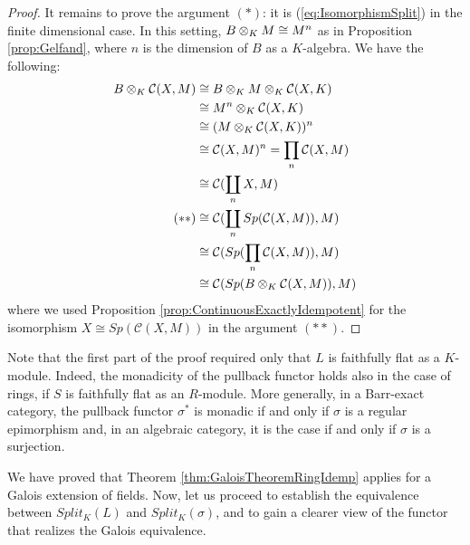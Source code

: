 \begin{proposition}
\begin{proof}
        It remains to prove the argument $(*)$: it is (\ref{eq:IsomorphismSplit}) in the finite dimensional case. In this setting, $B\otimes_{K}M\cong M^n$ as in Proposition \ref{prop:Gelfand}, where $n$ is the dimension of $B$ as a $K$-algebra. We have the following:
        \begin{align*}
            B\otimes_{K}\mathcal{C}(X,M) & \cong B\otimes_{K}M\otimes_{K}\mathcal{C}(X,K)\\
            & \cong M^n\otimes_{K}\mathcal{C}(X,K)\\
            & \cong (M\otimes_{K}\mathcal{C}(X,K))^n\\
            & \cong \mathcal{C}(X,M)^n = \prod_n\mathcal{C}(X,M)\\
            & \cong \mathcal{C}(\coprod_nX, M)\\
            (**)& \cong \mathcal{C}(\coprod_nSp(\mathcal{C}(X,M)),M)\\
            & \cong \mathcal{C}(Sp(\prod_n\mathcal{C}(X,M)), M)\\
            & \cong \mathcal{C}(Sp(B\otimes_{K}\mathcal{C}(X,M)),M)
        \end{align*}
        where we used Proposition \ref{prop:ContinuousExactlyIdempotent} for the isomorphism $X\cong Sp(\mathcal{C}(X,M))$ in the argument $(**)$.
    \end{proof}
\end{proposition}
\begin{oss*}
    Note that the first part of the proof required only that $L$ is faithfully flat as a $K$-module. Indeed, the monadicity of the pullback functor holds also in the case of rings, if $S$ is faithfully flat as an $R$-module. More generally, in a Barr-exact category, the pullback functor $\sigma^*$ is monadic if and only if $\sigma$ is a regular epimorphism and, in an algebraic category, it is the case if and only if $\sigma$ is a surjection.
\end{oss*}

We have proved that Theorem \ref{thm:GaloisTheoremRingIdemp} applies for a Galois extension of fields. Now, let us proceed to establish the equivalence between $Split_K(L)$ and $Split_K(\sigma)$, and to gain a clearer view of the functor that realizes the Galois equivalence.

